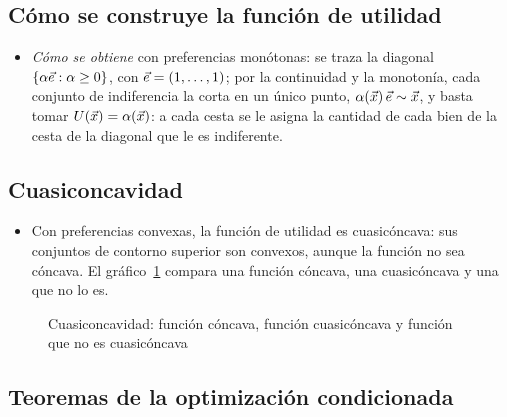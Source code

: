 \documentclass[11pt]{article}
\begin{document}
\begin{infografia}[H]
\centering
\caption{La relación de preferencia: preferencia débil, indiferencia y preferencia estricta}\label{figu:preferencias-venn}
\end{infografia}

\subsection{Cómo se construye la función de utilidad}\label{anexo:construccion-utilidad}

\begin{itemize}
\item \emph{Cómo se obtiene} con preferencias monótonas\nocite{MasColellWhinstonGreen1995}: se traza la diagonal $\{\alpha\vec{e}: \alpha\geq 0\}$, con $\vec{e}=(1,\dots,1)$; por la continuidad y la monotonía, cada conjunto de indiferencia la corta en un único punto, $\alpha(\vec{x})\,\vec{e}\sim \vec{x}$, y basta tomar $U(\vec{x})=\alpha(\vec{x})$: a cada cesta se le asigna la cantidad de cada bien de la cesta de la diagonal que le es indiferente.
\end{itemize}

\subsection{Cuasiconcavidad}\label{anexo:cuasiconcavidad}

\begin{itemize}
\item Con preferencias convexas, la función de utilidad es cuasicóncava: sus conjuntos de contorno superior son convexos, aunque la función no sea cóncava. El gráfico~\ref{fig:cuasiconcavidad} compara una función cóncava, una cuasicóncava y una que no lo es.
\end{itemize}

\begin{figure}[H]
\centering
\caption{Cuasiconcavidad: función cóncava, función cuasicóncava y función que no es cuasicóncava}\label{fig:cuasiconcavidad}
\end{figure}

\subsection{Teoremas de la optimización condicionada}\label{anexo:teoremas-optimizacion}
\end{document}
